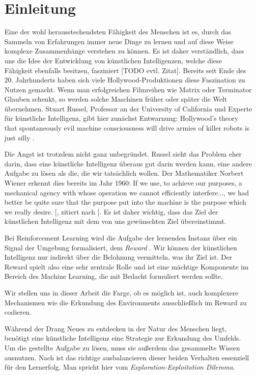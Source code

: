 \chapter{Einleitung} \label{sec:introduction}
Eine der wohl herausstechendsten Fähigkeit des Menschen ist es, durch das Sammeln von Erfahrungen immer neue Dinge zu lernen und auf diese Weise komplexe Zusammenhänge verstehen zu können. Es ist daher verständlich, dass uns die Idee der Entwicklung von künstlichen Intelligenzen, welche diese Fähigkeit ebenfalls besitzen, fasziniert [TODO evtl. Zitat]. Bereits seit Ende des 20. Jahrhunderts haben sich viele Hollywood-Produktionen diese Faszination zu Nutzen gemacht. Wenn man erfolgreichen Filmreihen wie \glqq Matrix\grqq{} oder \glqq Terminator\grqq{} Glauben schenkt, so werden solche Maschinen früher oder später die Welt übernehmen. Stuart Russel, Professor an der University of California und Experte für künstliche Intelligenz, gibt hier zunächst Entwarnung: \glqq Hollywood's theory that spontaneously evil machine consciousness will drive armies of killer robots is just silly\grqq{} \cite{14_russell2016should}.

Die Angst ist trotzdem nicht ganz unbegründet. Russel sieht das Problem eher darin, dass eine künstliche Intelligenz überaus gut darin werden kann, eine andere Aufgabe zu lösen als die, die wir tatsächlich wollen. Der Mathematiker Norbert Wiener erkennt dies bereits im Jahr 1960: \glqq If we use, to achieve our purposes, a mechanical agency with whose operation we cannot efficiently interfere..., we had better be quite sure that the purpose put into the machine is the purpose which we really desire.\grqq{} [\cite{14-2_wiener1960some}, zitiert nach \cite{14_russell2016should}]. Es ist daher wichtig, dass das Ziel der künstlichen Intelligenz mit dem von uns gewünschten Ziel übereinstimmt.

Bei Reinforcement Learning wird die Aufgabe der lernenden Instanz über ein Signal der Umgebung formalisiert, dem \textit{Reward} \cite{06_sutton2018reinforcement}. Wir können der künstlichen Intelligenz nur indirekt über die Belohnung vermitteln, was ihr Ziel ist. Der Reward spielt also eine sehr zentrale Rolle und ist eine mächtige Komponente im Bereich des Machine Learning, die mit Bedacht formuliert werden sollte.

Wir stellen uns in dieser Arbeit die Farge, ob es möglich ist, auch komplexere Mechanismen wie die Erkundung des Environments ausschließlich im Reward zu codieren.

Während der Drang Neues zu entdecken in der Natur des Menschen liegt, benötigt eine künstliche Intelligenz eine Strategie zur Erkundung des Umfelds. Um die gestellte Aufgabe zu lösen, muss sie außerdem das gesammelte Wissen ausnutzen. Nach \cite{06_sutton2018reinforcement} ist das richtige ausbalancieren dieser beiden Verhalten essenziell für den Lernerfolg. Man spricht hier vom \textit{Exploration-Exploitation Dilemma}.

